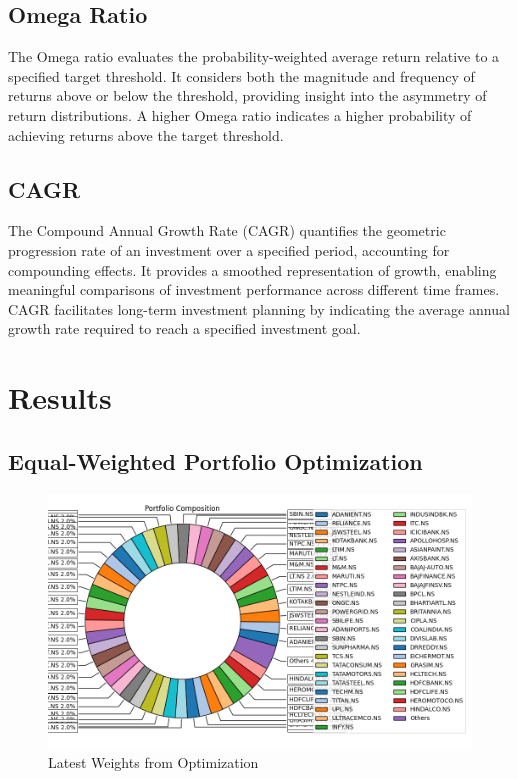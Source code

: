 \subsection{Omega Ratio}
The Omega ratio evaluates the probability-weighted average return relative to a specified target threshold. It considers both the magnitude and frequency of returns above or below the threshold, providing insight into the asymmetry of return distributions. A higher Omega ratio indicates a higher probability of achieving returns above the target threshold.

\subsection{CAGR}
The Compound Annual Growth Rate (CAGR) quantifies the geometric progression rate of an investment over a specified period, accounting for compounding effects. It provides a smoothed representation of growth, enabling meaningful comparisons of investment performance across different time frames. CAGR facilitates long-term investment planning by indicating the average annual growth rate required to reach a specified investment goal.

\section{Results}
\subsection{Equal-Weighted Portfolio Optimization}

\begin{figure}[H]
   \centering
   \includegraphics[width=1\linewidth]{images/equal_weight/Weights.png}
   \caption{Latest Weights from Optimization}
   \label{fig:network_architecture1}
 \end{figure}

